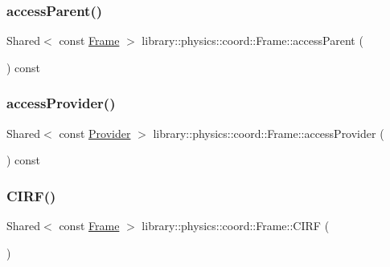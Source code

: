 \subsubsection{\texorpdfstring{access\+Parent()}{accessParent()}}
{\footnotesize\ttfamily Shared$<$ const \hyperlink{classlibrary_1_1physics_1_1coord_1_1_frame}{Frame} $>$ library\+::physics\+::coord\+::\+Frame\+::access\+Parent (\begin{DoxyParamCaption}{ }\end{DoxyParamCaption}) const}

\mbox{\label{classlibrary_1_1physics_1_1coord_1_1_frame_a5da9096ace352a91d272677cc159c059}} 
\subsubsection{\texorpdfstring{access\+Provider()}{accessProvider()}}
{\footnotesize\ttfamily Shared$<$ const \hyperlink{classlibrary_1_1physics_1_1coord_1_1frame_1_1_provider}{Provider} $>$ library\+::physics\+::coord\+::\+Frame\+::access\+Provider (\begin{DoxyParamCaption}{ }\end{DoxyParamCaption}) const}

\mbox{\label{classlibrary_1_1physics_1_1coord_1_1_frame_a0786e3028527a43e423936989a9cd294}} 
\subsubsection{\texorpdfstring{C\+I\+R\+F()}{CIRF()}}
{\footnotesize\ttfamily Shared$<$ const \hyperlink{classlibrary_1_1physics_1_1coord_1_1_frame}{Frame} $>$ library\+::physics\+::coord\+::\+Frame\+::\+C\+I\+RF (\begin{DoxyParamCaption}{ }\end{DoxyParamCaption})\hspace{0.3cm}{\ttfamily [static]}}

